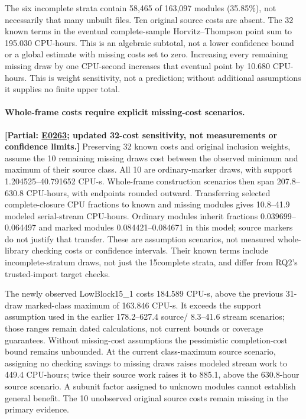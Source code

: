 \documentclass[10pt,twocolumn]{article}
\newcommand{\partialev}[1]{\textbf{[Partial: #1]}}
\newcommand{\expref}[2]{\href{https://github.com/yunwei37/proofserve/blob/main/docs/tmp/build-and-evaluate/step-#1/step-report.md}{E#2}}
\begin{document}
The six incomplete strata contain 58,465 of 163,097 modules (35.85\%),
not necessarily that many unbuilt files. Ten original source costs are absent.
The 32 known terms in the eventual complete-sample Horvitz--Thompson point
sum to 195.030 CPU-hours. This is an algebraic subtotal, not a lower confidence
bound or a global estimate with missing costs set to zero.
Increasing every remaining missing draw by one CPU-second increases that
eventual point by 10.680 CPU-hours. This is weight sensitivity, not a
prediction; without additional assumptions it supplies no finite upper total.

\paragraph{Whole-frame costs require explicit missing-cost scenarios.}
\partialev{\expref{0263-20261102T040256+0000}{0263}; updated 32-cost sensitivity, not measurements or confidence limits.}
Preserving 32 known costs and original inclusion weights, assume the 10 remaining
missing draws cost between the observed minimum and maximum of their source
class. All 10 are ordinary-marker draws, with support 1.204525--40.791652 CPU-s.
Whole-frame construction scenarios then span 207.8--630.8 CPU-hours,
with endpoints rounded outward.
Transferring selected complete-closure CPU fractions to known and missing
modules gives 10.8--41.9 modeled serial-stream CPU-hours.
Ordinary modules inherit fractions 0.039699--0.064497 and marked modules
0.084421--0.084671 in this model; source markers do not justify that transfer.
These are assumption scenarios, not measured whole-library checking costs
or confidence intervals. Their known terms include incomplete-stratum draws,
not just the 15complete strata, and differ from RQ2's trusted-import target checks.

The newly observed LowBlock15\_1 costs 184.589 CPU-s, above the previous
31-draw marked-class maximum of 163.846 CPU-s.
It exceeds the support assumption used in the earlier 178.2--627.4 source/
8.3--41.6 stream scenarios; those ranges remain dated calculations, not current
bounds or coverage guarantees.
Without missing-cost assumptions the pessimistic completion-cost bound
remains unbounded. At the current class-maximum source scenario, assigning
no checking savings to missing draws raises modeled stream work to 449.4 CPU-hours;
twice their source work raises it to 885.1, above the 630.8-hour source scenario.
A subunit factor assigned to unknown modules cannot establish general benefit.
The 10 unobserved original source costs remain missing in the primary evidence.
\end{document}
